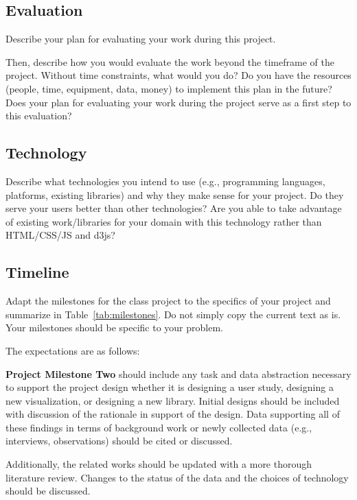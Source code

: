 \subsection{Evaluation}
\label{sec:eval}

Describe your plan for evaluating your work during this project.

Then, describe how you would evaluate the work beyond the timeframe of the
project. Without time constraints, what would you do? Do you have the
resources (people, time, equipment, data, money) to implement this plan in
the future? Does your plan for evaluating your work during the project serve
as a first step to this evaluation?

\subsection{Technology}
\label{sec:tech}

Describe what technologies you intend to use (e.g., programming languages,
platforms, existing libraries) and why they make sense for your project. Do
they serve your users better than other technologies? Are you able to take
advantage of existing work/libraries for your domain with this technology
rather than HTML/CSS/JS and d3js?  

\subsection{Timeline}
\label{sec:timeline}

Adapt the milestones for the class project to the specifics of your project
and summarize in Table~\ref{tab:milestones}. Do not simply copy the current
text as is. Your milestones should be specific to your problem.

The expectations are as follows:

\vspace{1.5ex}\noindent\textbf{Project Milestone Two} should include any task
and data abstraction necessary to support the project design whether it is
designing a user study, designing a new visualization, or designing a new
library. Initial designs should be included with discussion of the rationale
in support of the design. Data supporting all of these findings in terms of
background work or newly collected data (e.g., interviews, observations)
should be cited or discussed.

Additionally, the related works should be updated with a more thorough
literature review. Changes to the status of the data and the choices of
technology should be discussed.

